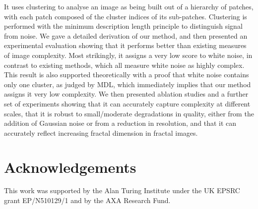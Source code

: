 \documentclass[a4paper,fleqn]{cas-sc}
\theoremstyle{remark}
\begin{document}
It uses clustering to analyse an image as being built out of a hierarchy of patches, with each patch composed of the cluster indices of its sub-patches. Clustering is performed with the minimum description length principle to distinguish signal from noise. We gave a detailed derivation of our method, and then presented an experimental evaluation showing that it performs better than existing measures of image complexity. Most strikingly, it assigns a very low score to white noise, in contrast to existing methods, which all measure white noise as highly complex. This result is also supported theoretically with a proof that white noise contains only one cluster, as judged by MDL, which immediately implies that our method assigns it very low complexity. We then presented ablation studies 
and a further set of experiments showing that it can accurately capture complexity at different scales, that it is robust to small/moderate degradations in quality, either from the addition of Gaussian noise or from a reduction in resolution, and that it can accurately reflect increasing fractal dimension in fractal images. 


\section*{Acknowledgements}
This work was supported by the Alan Turing Institute under the UK EPSRC grant EP/N510129/1 and by the AXA Research Fund.

\printbibliography


\appendix


\end{document}
